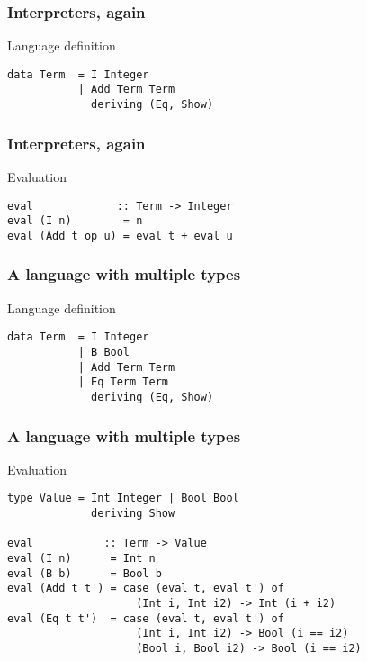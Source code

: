 \documentclass[pdftex,aspectratio=169]{beamer}
\author[Gabriel Radanne]{Dr. Gabriel Radanne}
\subtitle
{GADT: Generalize Algebraic DataType}
\begin{document}
\begin{frame}
  \titlepage
\end{frame}

\begin{frame}[fragile]
  \frametitle{Interpreters, again}
  \begin{block}{Language definition}
    \begin{lstlisting}
data Term  = I Integer
           | Add Term Term
             deriving (Eq, Show)
  \end{lstlisting}
\end{block}
\end{frame}

\begin{frame}[fragile]
  \frametitle{Interpreters, again}
  \begin{block}{Evaluation}
    \begin{lstlisting}
eval             :: Term -> Integer
eval (I n)        = n
eval (Add t op u) = eval t + eval u
  \end{lstlisting}
\end{block}
\end{frame}


\begin{frame}[fragile]
  \frametitle{A language with multiple types}
  \begin{block}{Language definition}
    \begin{lstlisting}
data Term  = I Integer
           | B Bool
           | Add Term Term
           | Eq Term Term
             deriving (Eq, Show)
  \end{lstlisting}
\end{block}
\end{frame}

\begin{frame}[fragile]
  \frametitle{A language with multiple types}
  \begin{block}{Evaluation}
    \begin{lstlisting}
type Value = Int Integer | Bool Bool
             deriving Show
      
eval           :: Term -> Value
eval (I n)      = Int n
eval (B b)      = Bool b
eval (Add t t') = case (eval t, eval t') of
                    (Int i, Int i2) -> Int (i + i2)
eval (Eq t t')  = case (eval t, eval t') of
                    (Int i, Int i2) -> Bool (i == i2)
                    (Bool i, Bool i2) -> Bool (i == i2)
  \end{lstlisting}
\end{block}
\end{frame}
\end{document}
